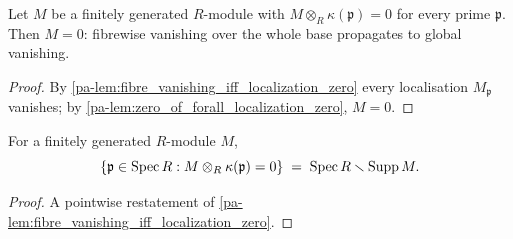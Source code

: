 \begin{theorem}
  \label{pa-thm:fibrewise_vanishing_propagates}
  \leanok

  Let \(M\) be a finitely generated \(R\)-module with
  \(M \otimes_R \kappa(\mathfrak p) = 0\) for every prime \(\mathfrak p\). Then
  \(M = 0\): fibrewise vanishing over the whole base propagates to global vanishing.
\end{theorem}
\begin{proof}
  \leanok
  By \ref{pa-lem:fibre_vanishing_iff_localization_zero} every localisation
  \(M_{\mathfrak p}\) vanishes; by \ref{pa-lem:zero_of_forall_localization_zero},
  \(M = 0\).
\end{proof}

\begin{lemma}
  \label{pa-lem:fibre_vanishing_locus_compl_support}
  \leanok

  For a finitely generated \(R\)-module \(M\),
  \[
    \{\mathfrak p \in \operatorname{Spec} R : M \otimes_R \kappa(\mathfrak p) = 0\}
    \;=\; \operatorname{Spec} R \smallsetminus \operatorname{Supp} M .
  \]
\end{lemma}
\begin{proof}
  \leanok
  A pointwise restatement of \ref{pa-lem:fibre_vanishing_iff_localization_zero}.
\end{proof}

